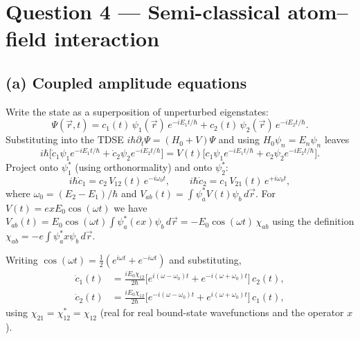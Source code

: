 \documentclass[11pt]{article}
\begin{document}
\section*{Question 4 --- Semi-classical atom--field interaction}

\subsection*{(a) Coupled amplitude equations}

Write the state as a superposition of unperturbed eigenstates:
\begin{equation*}
    \Psi(\vec r,t) = c_1(t)\,\psi_1(\vec r)\,e^{-iE_1 t/\hbar} + c_2(t)\,\psi_2(\vec r)\,e^{-iE_2 t/\hbar}.
\end{equation*}
Substituting into the TDSE $i\hbar\partial_t\Psi = (H_0+V)\Psi$ and using $H_0\psi_n=E_n\psi_n$ leaves
\begin{equation*}
    i\hbar\bigl[\dot c_1\psi_1 e^{-iE_1t/\hbar}+\dot c_2\psi_2 e^{-iE_2t/\hbar}\bigr] = V(t)\bigl[c_1\psi_1 e^{-iE_1t/\hbar}+c_2\psi_2 e^{-iE_2t/\hbar}\bigr].
\end{equation*}
Project onto $\psi_1^*$ (using orthonormality) and onto $\psi_2^*$:
\begin{equation*}
    i\hbar\dot c_1 = c_2\,V_{12}(t)\,e^{-i\omega_0 t},\qquad i\hbar\dot c_2 = c_1\,V_{21}(t)\,e^{+i\omega_0 t},
\end{equation*}
where $\omega_0=(E_2-E_1)/\hbar$ and $V_{ab}(t)=\int\psi_a^* V(t)\psi_b\,d\vec r$. For $V(t)=exE_0\cos(\omega t)$ we have $V_{ab}(t)=E_0\cos(\omega t)\int\psi_a^*(ex)\psi_b\,d\vec r = -E_0\cos(\omega t)\,\chi_{ab}$ using the definition $\chi_{ab}=-e\!\int\psi_a^* x\psi_b\,d\vec r$.

Writing $\cos(\omega t)=\tfrac12(e^{i\omega t}+e^{-i\omega t})$ and substituting,
\begin{equation}
\boxed{\;
\begin{aligned}
    \dot c_1(t) &= \frac{iE_0\chi_{12}}{2\hbar}\bigl[e^{i(\omega-\omega_0)t}+e^{-i(\omega+\omega_0)t}\bigr]\,c_2(t), \\
    \dot c_2(t) &= \frac{iE_0\chi_{12}}{2\hbar}\bigl[e^{-i(\omega-\omega_0)t}+e^{i(\omega+\omega_0)t}\bigr]\,c_1(t),
\end{aligned}\;}\label{eq:coupled}
\end{equation}
using $\chi_{21}=\chi_{12}^*=\chi_{12}$ (real for real bound-state wavefunctions and the operator $x$).
\end{document}

